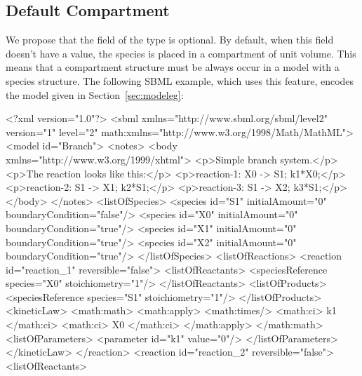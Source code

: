 \documentclass[10pt]{cekarticle}
\begin{document}
\subsection{Default Compartment}
\label{sec:defaultcompartment}
We propose that the  field of the  type is optional.  By default, when this field doesn't have a value, the species is placed in a compartment of unit volume.  This means that a compartment structure must be always occur in a model with a species structure.
The following SBML example, which uses this feature, encodes the model given in Section~\ref{sec:modeleg}:
\begin{example}
<?xml version="1.0"?>
<sbml xmlns="http://www.sbml.org/sbml/level2" version="1" level="2"
      math:xmlns="http://www.w3.org/1998/Math/MathML">
    <model id="Branch">
        <notes>
            <body xmlns="http://www.w3.org/1999/xhtml">
                <p>Simple branch system.</p>
                <p>The reaction looks like this:</p>
                <p>reaction-1:   X0 -> S1; k1*X0;</p>
                <p>reaction-2:   S1 -> X1; k2*S1;</p>
                <p>reaction-3:   S1 -> X2; k3*S1;</p>
            </body>
        </notes>
        <listOfSpecies>
            <species id="S1" initialAmount="0" boundaryCondition="false"/>
            <species id="X0" initialAmount="0" boundaryCondition="true"/>
            <species id="X1" initialAmount="0" boundaryCondition="true"/>
            <species id="X2" initialAmount="0" boundaryCondition="true"/>
        </listOfSpecies>
        <listOfReactions>
            <reaction id="reaction_1" reversible="false">
                <listOfReactants>
                    <speciesReference species="X0" stoichiometry="1"/>
                </listOfReactants>
                <listOfProducts>
                    <speciesReference species="S1" stoichiometry="1"/>
                </listOfProducts>
                <kineticLaw>
                    <math:math>
                        <math:apply>
                            <math:times/>
                            <math:ci> k1 </math:ci>
                            <math:ci> X0 </math:ci>
                        </math:apply>
                    </math:math>
                    <listOfParameters>
                        <parameter id="k1" value="0"/>
                    </listOfParameters>
                </kineticLaw>
            </reaction>
            <reaction id="reaction_2" reversible="false">
                <listOfReactants>

\end{example}
\end{document}
